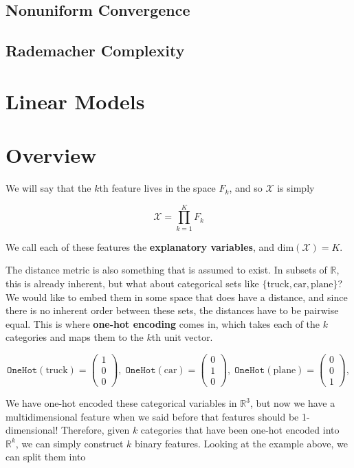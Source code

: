 \documentclass{article}
\theoremstyle{definition}
\begin{document}
  \subsection{Nonuniform Convergence}

  \subsection{Rademacher Complexity}

\section{Linear Models}

\section{Overview}


  We will say that the $k$th feature lives in the space $F_k$, and so $\mathcal{X}$ is simply 

    \[\mathcal{X} = \prod_{k=1}^K  F_k\]

  We call each of these features the \textbf{explanatory variables}, and $\mathrm{dim}(\mathcal{X}) = K$. 

  The distance metric is also something that is assumed to exist. In subsets of $\mathbb{R}$, this is already inherent, but what about categorical sets like $\{\text{truck}, \text{car}, \text{plane}\}$? We would like to embed them in some space that does have a distance, and since there is no inherent order between these sets, the distances have to be pairwise equal. This is where \textbf{one-hot encoding} comes in, which takes each of the $k$ categories and maps them to the $k$th unit vector. 

    \[\texttt{OneHot}(\text{truck}) = \begin{pmatrix} 1 \\ 0 \\ 0 \end{pmatrix}, \; \texttt{OneHot}(\text{car}) = \begin{pmatrix} 0 \\ 1 \\ 0 \end{pmatrix}, \; \texttt{OneHot}(\text{plane}) = \begin{pmatrix} 0 \\ 0 \\ 1 \end{pmatrix}, \]

  We have one-hot encoded these categorical variables in $\mathbb{R}^3$, but now we have a multidimensional feature when we said before that features should be 1-dimensional! Therefore, given $k$ categories that have been one-hot encoded into $\mathbb{R}^k$, we can simply construct $k$ binary features. Looking at the example above, we can split them into 
\end{document}
